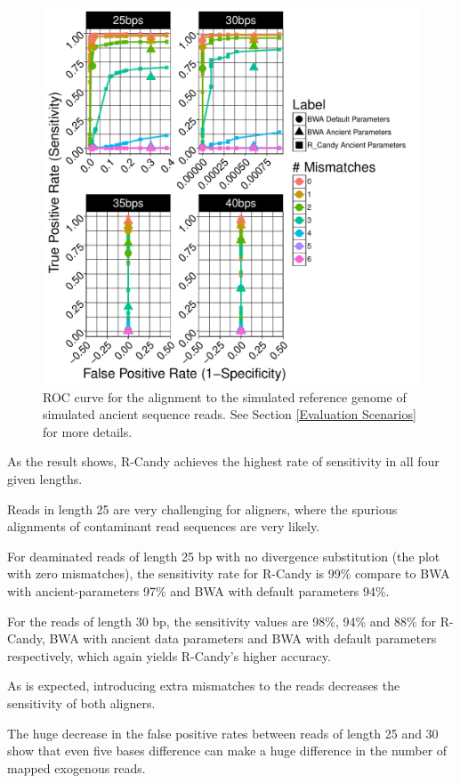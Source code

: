\documentclass[11pt,a4paper]{report}
\begin{document}
\begin{figure}[H]
\centering
\includegraphics[width=12cm]{pictures/f_DS1_emp.pdf}

\caption{
ROC curve for the alignment to the simulated reference genome of simulated ancient
sequence reads. See Section \ref{Evaluation Scenarios} for more details.}
\label{DS1_emp}
\end{figure}


As the result shows, R-Candy achieves the highest rate of sensitivity
in all four given lengths.

Reads in length 25 are very challenging for aligners, where
the spurious alignments of contaminant read sequences are very likely.

For deaminated reads of length 25 bp with no divergence substitution 
(the plot with zero mismatches), the sensitivity rate for R-Candy is 99\% 
compare to BWA with ancient-parameters 97\% and BWA with default parameters 94\%. 


For the reads of length 30 bp, the sensitivity values are 98\%, 94\% 
and 88\% for R-Candy, BWA with ancient data parameters and BWA with 
default parameters respectively, which again yields R-Candy's higher
accuracy.

As is expected, introducing extra mismatches to the reads decreases  
the sensitivity of both aligners.

The huge decrease in the false positive rates between reads of length 
25 and 30 show that even five bases difference can make a huge 
difference in the number of mapped exogenous reads.
\end{document}
